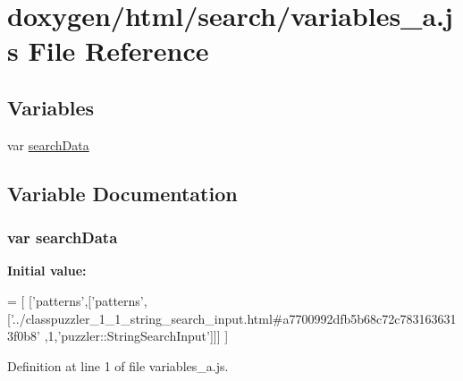 \hypertarget{a00114}{}\section{doxygen/html/search/variables\+\_\+a.js File Reference}
\label{a00114}
\subsection*{Variables}
\begin{DoxyCompactItemize}
\item 
var \hyperlink{a00114_ad01a7523f103d6242ef9b0451861231e}{search\+Data}
\end{DoxyCompactItemize}


\subsection{Variable Documentation}
\hypertarget{a00114_ad01a7523f103d6242ef9b0451861231e}{}
\subsubsection[{search\+Data}]{\setlength{\rightskip}{0pt plus 5cm}var search\+Data}\label{a00114_ad01a7523f103d6242ef9b0451861231e}
{\bfseries Initial value\+:}
\begin{DoxyCode}
=
[
  [\textcolor{stringliteral}{'patterns'},[\textcolor{stringliteral}{'patterns'},[\textcolor{stringliteral}{'../classpuzzler\_1\_1\_string\_search\_input.html#a7700992dfb5b68c72c7831636313f0b8'}
      ,1,\textcolor{stringliteral}{'puzzler::StringSearchInput'}]]]
]
\end{DoxyCode}


Definition at line 1 of file variables\+\_\+a.\+js.

